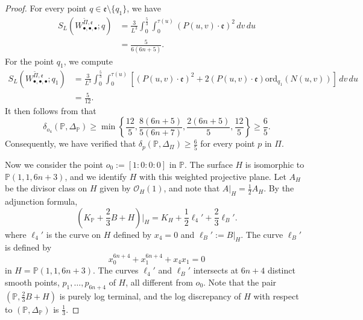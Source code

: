 \documentclass[12pt]{amsart}
\theoremstyle{definition}
\theoremstyle{remark}
\begin{document}
\begin{proof}
For every point $q\in \mathfrak{e}\setminus\{q_1\}$, we have
\begin{equation}\label{eq:W3dot}
\begin{split}
S_L (W_{\bullet, \bullet, \bullet}^{\widetilde{\Pi}, \mathfrak{e}}; q) 
&=  \frac{3}{L^3}\int_0^{\frac{5}{3}}  \int_0^{\tau(u)}\left(P(u,v)\cdot\mathfrak{e}\right)^2\,dv 
\,du \\
&= \frac{5}{6(6n+5)}.
\end{split}
\end{equation}
For the point $q_1$, we compute
\begin{equation}\label{eq:WS3dot}
\begin{split}
S_L (W_{\bullet, \bullet, \bullet}^{\widetilde{\Pi}, \mathfrak{e}}; q_1) 
&=  \frac{3}{L^3}\int_0^{\frac{5}{3}}  \int_0^{\tau(u)}\left[\left(P(u,v)\cdot\mathfrak{e}\right)^2+2\left(P(u,v)\cdot\mathfrak{e} \right)\mathrm{ord}_{q_1}\left(N(u,v)\right)\right]
\,dv \,du \\
&= \frac{5}{12}.
\end{split}
\end{equation}
It then follows from \cite[Corollary~4.8]{Fu23} that
\[\delta_{o_4}\left(\mathbb{P}, \Delta_\mathbb{P}\right)\geq \min\left\{\frac{12}{5}, \frac{8(6n+5)}{5(6n+7)}, \frac{2(6n+5)}{5}, \frac{12}{5}\right\}\geq\frac{6}{5}.\]
Consequently,  we have verified that
$\delta_{p}\left(\mathbb{P}, \Delta_\Pi\right)\geq\frac{6}{5}$ for every point $p$ in $\Pi$.

Now we consider the point $o_0:=[1:0:0:0]$ in $\mathbb{P}$. The surface $H$ is isomorphic to $\mathbb{P}(1,1, 6n+3)$, and we  identify $H$ with this weighted projective plane. Let $A_H$ be the divisor class on $H$ given by $\mathcal{O}_H(1)$, and note that $A|_H=\frac{1}{2}A_H$.
By the adjunction formula, 
\[\left(K_\mathbb{P}+\frac{2}{3}B+H\right)\Big|_{H}=K_{H}+\frac{1}{2}\ell_4'+\frac{2}{3}\ell_B'.\]
where $\ell_4'$ is the curve on $H$ defined by $x_4=0$ and  $\ell_B':=B|_{H}$.
The curve $\ell_B'$ is defined by
\[x_0^{6n+4}+x_1^{6n+4}+x_4x_1=0\]
in $H=\mathbb{P}(1,1, 6n+3)$. 
The curves $\ell_4'$ and $\ell_B'$ intersects at $6n+4$ distinct smooth  points, $p_1, \ldots, p_{6n+4}$ of $H$, all different from $o_0$.
Note that the pair $(\mathbb{P}, \frac{2}{3}B+H)$ is purely log terminal, and the log discrepancy of $H$ with respect to $(\mathbb{P},\Delta_\mathbb{P})$ is $\frac{1}{3}$.



\end{proof}
\end{document}
